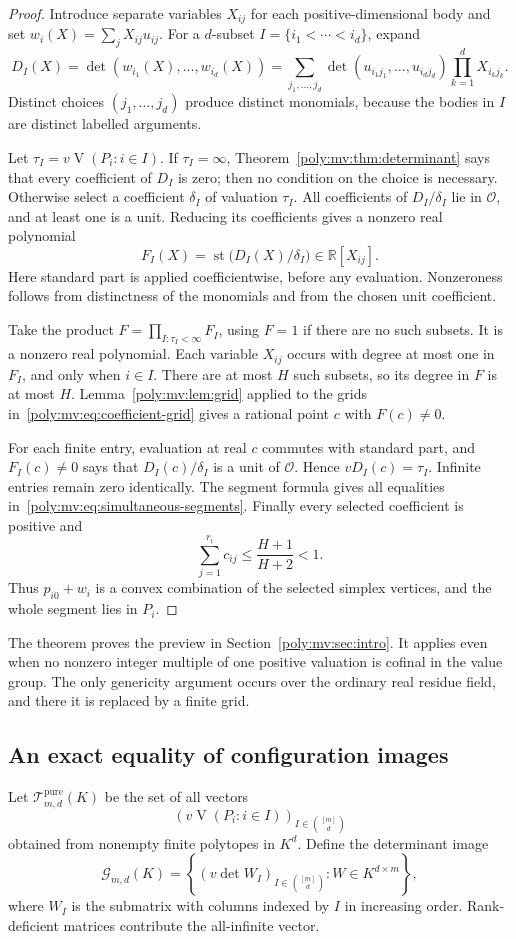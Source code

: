 \documentclass[11pt,a4paper]{article}
\numberwithin{equation}{section}
\theoremstyle{plain}
\newcommand{\R}{\mathbb R}
\newcommand{\st}{\operatorname{st}}
\newcommand{\OO}{\mathcal O}
\newcommand{\MV}{\operatorname{V}}
\begin{document}
\begin{proof}
Introduce separate variables $X_{ij}$ for each positive-dimensional
body and set $w_i(X)=\sum_jX_{ij}u_{ij}$. For a $d$-subset
$I=\{i_1<\cdots<i_d\}$, expand
\[
 D_I(X)=\det(w_{i_1}(X),\ldots,w_{i_d}(X))
       =\sum_{j_1,\ldots,j_d}
          \det(u_{i_1j_1},\ldots,u_{i_dj_d})
          \prod_{k=1}^dX_{i_kj_k}.
\]
Distinct choices $(j_1,\ldots,j_d)$ produce distinct monomials, because
the bodies in $I$ are distinct labelled arguments.

Let $\tau_I=v\MV(P_i:i\in I)$. If $\tau_I=\infty$,
Theorem~\ref{poly:mv:thm:determinant} says that every coefficient of $D_I$ is
zero; then no condition on the choice is necessary. Otherwise select a
coefficient $\delta_I$ of valuation $\tau_I$. All coefficients of
$D_I/\delta_I$ lie in $\OO$, and at least one is a unit. Reducing its
coefficients gives a nonzero real polynomial
\[
 F_I(X)=\st\bigl(D_I(X)/\delta_I\bigr)\in\R[X_{ij}].
\]
Here standard part is applied coefficientwise, before any evaluation.
Nonzeroness follows from distinctness of the monomials and from the
chosen unit coefficient.

Take the product $F=\prod_{I:\tau_I<\infty}F_I$, using $F=1$ if there
are no such subsets. It is a nonzero real polynomial. Each variable
$X_{ij}$ occurs with degree at most one in $F_I$, and only when $i\in I$.
There are at most $H$ such subsets, so its degree in $F$ is at most $H$.
Lemma~\ref{poly:mv:lem:grid} applied to the grids in~\eqref{poly:mv:eq:coefficient-grid}
gives a rational point $c$ with $F(c)\ne0$.

For each finite entry, evaluation at real $c$ commutes with standard
part, and $F_I(c)\ne0$ says that $D_I(c)/\delta_I$ is a unit of $\OO$.
Hence $vD_I(c)=\tau_I$. Infinite entries remain zero identically. The
segment formula gives all equalities in~\eqref{poly:mv:eq:simultaneous-segments}.
Finally every selected coefficient is positive and
\[
 \sum_{j=1}^{r_i}c_{ij}\le\frac{H+1}{H+2}<1.
\]
Thus $p_{i0}+w_i$ is a convex combination of the selected simplex
vertices, and the whole segment lies in $P_i$.
\end{proof}

The theorem proves the preview in Section~\ref{poly:mv:sec:intro}. It applies
even when no nonzero integer multiple of one positive valuation is
cofinal in the value group. The only genericity argument occurs over the
ordinary real residue field, and there it is replaced by a finite grid.

\subsection{An exact equality of configuration images}
Let $\mathcal T^{\mathrm{pure}}_{m,d}(K)$ be the set of all vectors
\[
 \left(v\MV(P_i:i\in I)\right)_{I\in\binom{[m]}d}
\]
obtained from nonempty finite polytopes in $K^d$. Define the determinant
image
\[
 \mathcal G_{m,d}(K)
 =\left\{\left(v\det W_I\right)_{I\in\binom{[m]}d}:
                    W\in K^{d\times m}\right\},
\]
where $W_I$ is the submatrix with columns indexed by $I$ in increasing
order. Rank-deficient matrices contribute the all-infinite vector.
\end{document}
